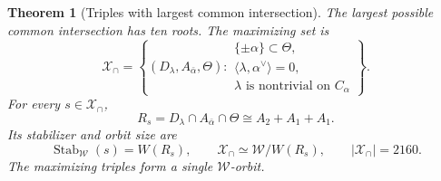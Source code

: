 \documentclass[11pt]{article}
\newtheorem{theorem}{Theorem}[section]
\theoremstyle{remark}
\begin{document}
\begin{theorem}[Triples with largest common intersection]
\label{thm:common-intersection}
The largest possible common intersection has ten roots. The maximizing set is
\[
 \mathcal X_{\cap}
 =\left\{(D_\lambda,A_{\bar\alpha},\Theta):
 \begin{array}{l}
   \{\pm\alpha\}\subset\Theta,\\
   \langle\lambda,\alpha^\vee\rangle=0,\\
   \lambda\text{ is nontrivial on }C_\alpha
 \end{array}\right\}.
\]
For every \(s\in\mathcal X_{\cap}\),
\[
 R_s=D_\lambda\cap A_{\bar\alpha}\cap\Theta
 \cong A_2+A_1+A_1.
\]
Its stabilizer and orbit size are
\[
 \operatorname{Stab}_{\mathcal W}(s)=W(R_s),\qquad
 \mathcal X_{\cap}\simeq\mathcal W/W(R_s),\qquad
 |\mathcal X_{\cap}|=2160.
\]
The maximizing triples form a single \(\mathcal W\)-orbit.
\end{theorem}
\end{document}
